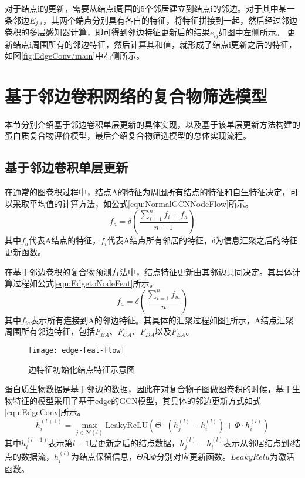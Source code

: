 对于结点i的更新，需要从结点i周围的5个邻居建立到结点i的邻边。对于其中某一条邻边$E_{j,i}$，其两个端点分别具有各自的特征，将特征拼接到一起，然后经过邻边卷积的多层感知器计算，即可得到邻边特征更新后的结果$e_{ij}$如图中左侧所示。
更新结点i周围所有的邻边特征，然后计算其和值，就形成了结点i更新之后的特征，如图\ref{fig:EdgeConv/main}中右侧所示。

\section{基于邻边卷积网络的复合物筛选模型}
\label{section:EdgeConv:detail}
本节分别介绍基于邻边卷积单层更新的具体实现，以及基于该单层更新方法构建的蛋白质复合物评价模型，最后介绍复合物筛选模型的总体实现流程。

\subsection{基于邻边卷积单层更新}

在通常的图卷积过程中，结点A的特征为周围所有结点的特征和自生特征决定，可以采取平均值的计算方法，如公式\ref{equ:NormalGCNNodeFlow}所示。
\begin{equation}
    \label{equ:NormalGCNNodeFlow}
    f_a=\delta (\frac{\sum_{i = 1}^{n}f_i+f_a}{n+1})
\end{equation}
其中$f_a$代表A结点的特征，$f_i$代表A结点所有邻居的特征，$\delta$为信息汇聚之后的特征更新函数。

在基于邻边卷积的复合物预测方法中，结点特征更新由其邻边共同决定。其具体计算过程如公式\ref{equ:EdgetoNodeFeat}所示。
\begin{equation}
    \label{equ:EdgetoNodeFeat}
    f_a=\delta (\frac{\sum_{i = 1}^{n}f_{ia}}{n})
\end{equation}
其中$f_{ia}$表示所有连接到A的邻边特征。其具体的汇聚过程如图\ref{fig:edge-feat-flow}所示，A结点汇聚周围所有邻边特征，包括$F_{BA}$、$F_{CA}$、$F_{DA}$以及$F_{EA}$。

\begin{figure}[htbp]
    \centering
    \texttt{[image: edge-feat-flow]}
    \caption{边特征初始化结点特征示意图}
    \label{fig:edge-feat-flow}
\end{figure}

蛋白质生物数据是基于邻边的数据，因此在对复合物子图做图卷积的时候，基于生物特征的模型采用了基于edge的GCN模型\cite{wang_dynamic_2019}，其具体的邻边更新方式如式\ref{equ:EdgeConv}所示。
\begin{equation}
    \label{equ:EdgeConv}
    h_i^{(l+1)} = \max_{j \in \mathcal{N}(i)} \mathrm{LeakyReLU}(
    \Theta \cdot (h_j^{(l)} - h_i^{(l)}) + \Phi \cdot h_i^{(l)})
\end{equation}
其中$h_i^{(l+1)}$表示第$l+1$层更新之后的结点数据，$h_j^{(l)} - h_i^{(l)}$表示从邻居结点到$i$结点的数据流，$h_i^{(l)}$为结点保留信息，$\Theta$和$\Phi$分别对应更新函数。$LeakyRelu$为激活函数。

